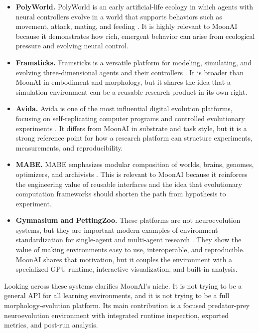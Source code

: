 \begin{itemize}[leftmargin=*]
  \item \textbf{PolyWorld.} PolyWorld is an early artificial-life ecology in which agents with
  neural controllers evolve in a world that supports behaviors such as movement, attack, mating,
  and feeding \cite{polyworld}. It is highly relevant to MoonAI because it demonstrates how rich,
  emergent behavior can arise from ecological pressure and evolving neural control.

  \item \textbf{Framsticks.} Framsticks is a versatile platform for modeling, simulating, and
  evolving three-dimensional agents and their controllers \cite{framsticks}. It is broader than
  MoonAI in embodiment and morphology, but it shares the idea that a simulation environment can
  be a reusable research product in its own right.

  \item \textbf{Avida.} Avida is one of the most influential digital evolution platforms,
  focusing on self-replicating computer programs and controlled evolutionary experiments
  \cite{avida}. It differs from MoonAI in substrate and task style, but it is a strong reference
  point for how a research platform can structure experiments, measurements, and reproducibility.

  \item \textbf{MABE.} MABE emphasizes modular composition of worlds, brains, genomes,
  optimizers, and archivists \cite{mabe}. This is relevant to MoonAI because it reinforces the
  engineering value of reusable interfaces and the idea that evolutionary computation frameworks
  should shorten the path from hypothesis to experiment.

  \item \textbf{Gymnasium and PettingZoo.} These platforms are not neuroevolution systems, but
  they are important modern examples of environment standardization for single-agent and
  multi-agent research \cite{gymnasium,pettingzoo}. They show the value of making environments
  easy to use, interoperable, and reproducible. MoonAI shares that motivation, but it couples the
  environment with a specialized GPU runtime, interactive visualization, and built-in analysis.
\end{itemize}

Looking across these systems clarifies MoonAI's niche. It is not trying to be a general API for
all learning environments, and it is not trying to be a full morphology-evolution platform. Its
main contribution is a focused predator-prey neuroevolution environment with integrated runtime
inspection, exported metrics, and post-run analysis.

